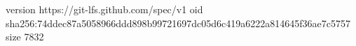 version https://git-lfs.github.com/spec/v1
oid sha256:74ddec87a5058966ddd898b99721697dc05d6c419a6222a814645f36ae7c5757
size 7832
